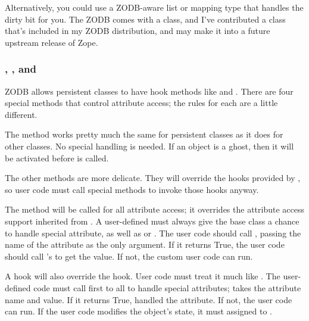 Alternatively, you could use a ZODB-aware list or mapping type that
handles the dirty bit for you.  The ZODB comes with a
 class, and I've contributed a
 class that's included in my ZODB distribution, 
and may make it into a future upstream release of Zope.


\subsubsection{, , and }

ZODB allows persistent classes to have hook methods like
 and .  There are four special
methods that control attribute access; the rules for each are a little
different.

The  method works pretty much the same for
persistent classes as it does for other classes.  No special handling
is needed.  If an object is a ghost, then it will be activated before
 is called.

The other methods are more delicate.  They will override the hooks
provided by , so user code must call special methods
to invoke those hooks anyway.

The  method will be called for all attribute
access; it overrides the attribute access support inherited from
.  A user-defined
 must always give the  base
class a chance to handle special attribute, as well as
 or .  The user code should
call , passing the name of the attribute as the
only argument.  If it returns True, the user code should call
's  to get the value.  If
not, the custom user code can run.

A  hook will also override the 
 hook.  User code must treat it much like 
.  The user-defined code must call
 first to all  to handle special
attributes;  takes the attribute name and value.
If it returns True,  handled the attribute.  If not,
the user code can run.  If the user code modifies the object's state,
it must assigned to .


